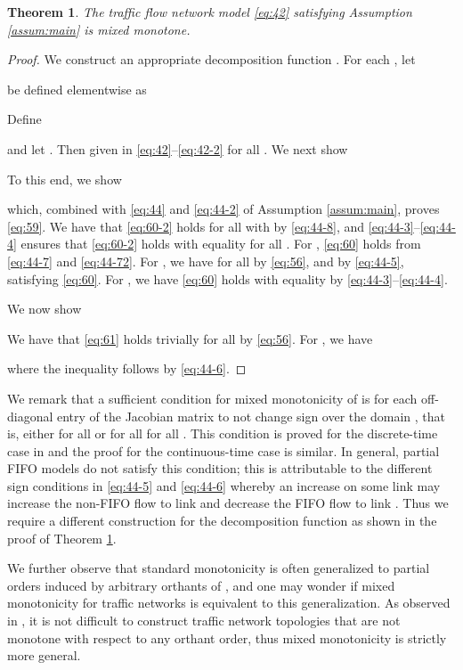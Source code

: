 \documentclass[letterpaper, 10 pt, conference]{ieeeconf}
\newtheorem{thm}{Theorem}
\begin{document}
\begin{thm}
\label{thm:MM}
The traffic flow network model \eqref{eq:42} satisfying Assumption \ref{assum:main} is mixed monotone.
\end{thm}
\begin{proof}
  We construct an appropriate decomposition function . For each , let 

be defined elementwise as

Define 

and let . Then  given in \eqref{eq:42}--\eqref{eq:42-2} for all .
We next show

To this end, we show

which, combined with \ref{eq:44} and \ref{eq:44-2} of Assumption \ref{assum:main}, proves \eqref{eq:59}.  We have that \eqref{eq:60-2} holds for all  with  by \ref{eq:44-8}, and \ref{eq:44-3}--\ref{eq:44-4} ensures that \eqref{eq:60-2} holds with equality for all . For , \eqref{eq:60} holds from \ref{eq:44-7} and \ref{eq:44-72}. For , we have  for all  by \eqref{eq:56}, and  by \ref{eq:44-5}, satisfying \eqref{eq:60}. For , we have \eqref{eq:60} holds with equality by \ref{eq:44-3}--\ref{eq:44-4}.

We now show

We have that \eqref{eq:61} holds trivially for all  by \eqref{eq:56}. For , we have

where the inequality follows by \ref{eq:44-6}.
\end{proof}


We remark that a sufficient condition for mixed monotonicity of  is for each off-diagonal entry of the Jacobian matrix  to not change sign over the domain , that is, either  for all   or  for all  for all . This condition is proved for the discrete-time case in \cite{Coogan:2014ty} and the proof for the continuous-time case is similar. In general, partial FIFO models do not satisfy this condition; this is attributable to the different sign conditions in \ref{eq:44-5} and \ref{eq:44-6} whereby an increase on some link  may increase the non-FIFO flow to link  and decrease the FIFO flow to link . Thus we require a different construction for the decomposition function as shown in the proof of Theorem \ref{thm:MM}. 

We further observe that standard monotonicity is often generalized to partial orders induced by arbitrary orthants of  \cite{Angeli:2003fv}, and one may wonder if mixed monotonicity for traffic networks is equivalent to this generalization. As observed in \cite{Coogan:2015mz}, it is not difficult to construct traffic network topologies that are not monotone with respect to any orthant order, thus mixed monotonicity is strictly more general.
\end{document}
